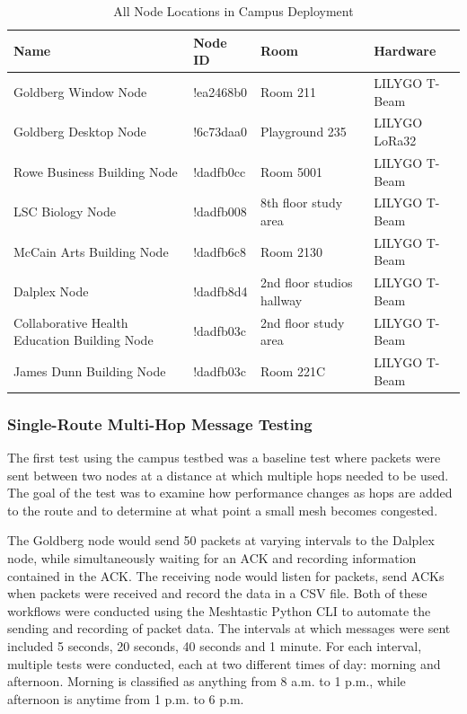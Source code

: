 \documentclass[11pt]{article}
\begin{document}
\begin{table}[htbp]
    \centering
    \caption{All Node Locations in Campus Deployment}
    \label{tab:node_locations}
    \begin{tabularx}{\textwidth}{X l X l}
        \toprule
        \textbf{Name} & \textbf{Node ID} & \textbf{Room} & \textbf{Hardware }\\
        \midrule
        Goldberg Window Node & !ea2468b0 & Room 211 & LILYGO T-Beam\\
        Goldberg Desktop Node & !6c73daa0 & Playground 235 & LILYGO LoRa32\\
        Rowe Business Building Node & !dadfb0cc & Room 5001 & LILYGO T-Beam\\
        LSC Biology Node & !dadfb008 & 8th floor study area & LILYGO T-Beam\\
        McCain Arts Building Node & !dadfb6c8 & Room 2130 & LILYGO T-Beam\\
        Dalplex Node & !dadfb8d4 & 2nd floor studios hallway & LILYGO T-Beam\\
        Collaborative Health Education Building Node & !dadfb03c & 2nd floor study area & LILYGO T-Beam\\
        James Dunn Building Node & !dadfb03c & Room 221C & LILYGO T-Beam\\
        \bottomrule
    \end{tabularx}
\end{table}

\FloatBarrier
\subsubsection{Single-Route Multi-Hop Message Testing}

The first test using the campus testbed was a baseline test where packets were sent between two nodes at a distance at which multiple hops needed to be used. The goal of the test was to examine how performance changes as hops are added to the route and to determine at what point a small mesh becomes congested.

The Goldberg node would send 50 packets at varying intervals to the Dalplex node, while simultaneously waiting for an ACK and recording information contained in the ACK. The receiving node would listen for packets, send ACKs when packets were received and record the data in a CSV file. Both of these workflows were conducted using the Meshtastic Python CLI to automate the sending and recording of packet data. The intervals at which messages were sent included 5 seconds, 20 seconds, 40 seconds and 1 minute. For each interval, multiple tests were conducted, each at two different times of day: morning and afternoon. Morning is classified as anything from 8 a.m. to 1 p.m., while afternoon is anytime from 1 p.m. to 6 p.m. 
\end{document}
